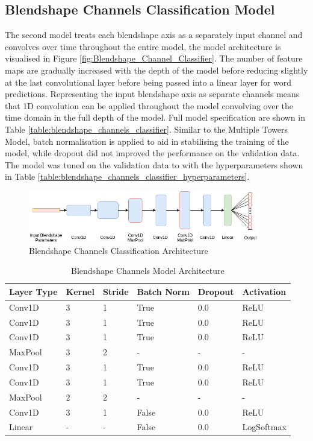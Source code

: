 \subsection{Blendshape Channels Classification Model}
The second model treats each blendshape axis as a separately input channel and convolves over time throughout the entire model, the model architecture is visualised in Figure \ref{fig:Blendshape_Channel_Classifier}.
The number of feature maps are gradually increased with the depth of the model before reducing slightly at the last convolutional layer before being passed into a linear layer for word predictions.
Representing the input blendshape axis as separate channels means that 1D convolution can be applied throughout the model convolving over the time domain in the full depth of the model.
Full model specification are shown in Table \ref{table:blendshape_channels_classifier}.
Similar to the Multiple Towers Model, batch normalisation is applied to aid in stabilising the training of the model, while dropout did not improved the performance on the validation data.
The model was tuned on the validation data to with the hyperparameters shown in Table \ref{table:blendshape_channels_classifier_hyperparameters}.

\begin{figure}[h!]
    \centering
        \includegraphics[width=0.9\textwidth]{figures/classification/blendshape_channels_arch.png}
    \caption{Blendshape Channels Classification Architecture}
\end{figure} \label{fig:Blendshape_Channel_Classifier}
\quad

\begin{table}[h!]
\centering
    \begin{tabular}{ | l | l | l | l | l | l |}
    \hline
    Layer Type & Kernel & Stride & Batch Norm & Dropout & Activation \\ \hline
    Conv1D & 3 & 1 & True & 0.0 & ReLU \\ \hline
    Conv1D & 3 & 1 & True & 0.0 & ReLU \\ \hline
    Conv1D & 3 & 1 & True & 0.0 & ReLU \\ \hline
    MaxPool & 3 & 2 & - & - & - \\ \hline
    Conv1D & 3 & 1 & True & 0.0 & ReLU \\ \hline
    Conv1D & 3 & 1 & True & 0.0 & ReLU \\ \hline
    MaxPool & 2 & 2 & - & - & - \\ \hline
    Conv1D & 3 & 1 & False & 0.0 & ReLU \\ \hline
    Linear & - & - & False & 0.0 & LogSoftmax \\
    \hline
    \end{tabular} 
    \caption{Blendshape Channels Model Architecture}
\end{table}\label{table:blendshape_channels_classifier}
\quad

